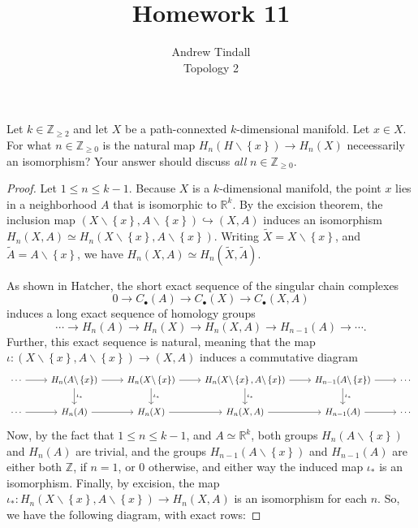 \documentclass[12pt]{article}
\newcommand{\Z}{\mathbb{Z}}
\newcommand{\R}{\mathbb{R}}
\theoremstyle{definition}
\newenvironment{problem}[2][Problem]{\begin{trivlist}
\item[\hskip \labelsep {\bfseries #1}\hskip \labelsep {\bfseries #2.}]}{\end{trivlist}}
\begin{document}
 
 
\title{Homework 11}
\author{Andrew Tindall \\
Topology 2}
\maketitle
\begin{problem}{1}
	Let $k \in \Z_{\geq 2}$ and let $X$ be a path-connexted $k$-dimensional manifold. Let $x \in X$. For what $n \in \Z_{\geq 0}$ is the natural map $H_n(H \backslash \left\{ x \right\}) \to H_n(X)$ neceessarily an isomorphism? Your answer should discuss \textit{all} $n \in \Z_{\geq 0}$.
	\begin{proof}
		\par Let $1 \leq n \leq k - 1$. Because $X$ is a $k$-dimensional manifold, the point $x$ lies in a neighborhood $A$ that is isomorphic to $\R^k$. By the excision theorem, the inclusion map $(X \backslash \left\{ x \right\}, A \backslash \left\{ x \right\}) \hookrightarrow (X, A)$ induces an isomorphism $H_n(X,A) \simeq H_n(X \backslash \left\{ x \right\}, A \backslash \left\{ x \right\})$. Writing $\tilde X = X \backslash \left\{ x \right\}$, and $\tilde A = A \backslash \left\{ x \right\}$, we have $H_n(X, A) \simeq H_n(\tilde X, \tilde A)$.
		\par As shown in Hatcher, the short exact sequence of the singular chain complexes \[0 \to C_\bullet(A) \to C_\bullet(X) \to C_\bullet(X, A)\]
		induces a long exact sequence of homology groups
		\[ \cdots \to H_n(A) \to H_n(X) \to H_n(X, A) \to H_{n-1}(A) \to \cdots.\]
		Further, this exact sequence is natural, meaning that the map $\iota: (X\backslash \left\{ x \right\}, A \backslash \left\{ x \right\}) \to (X, A)$ induces a commutative diagram
		\[\begin{tikzcd}\cdots \arrow[r] & H_n(A \backslash \left\{ x \right\}) \arrow[d, "\iota_*"] \arrow [r] & H_n(X \backslash \left\{ x \right\}) \arrow[d, "\iota_*"] \arrow[r] & H_n(X \backslash \left\{ x \right\}, A \backslash \left\{ x \right\}) \arrow[d, "\iota_*"] \arrow[r] & H_{n-1}(A \backslash \left\{ x \right\}) \arrow[d, "\iota_*"] \arrow[r] & \cdots\\
		\cdots \arrow[r] &H_n(A) \arrow[r] &H_n(X) \arrow[r] & H_n(X,A) \arrow[r] & H_{n-1}(A) \arrow[r] & \cdots \end{tikzcd}\]
		Now, by the fact that $1 \leq n \leq k-1$, and $A \simeq \R^k$, both groups $H_n(A \backslash \left\{ x \right\})$ and $H_n(A)$ are trivial, and the groups $H_{n-1}(A\backslash \left\{ x \right\} )$ and $H_{n-1}(A)$ are either both $\Z$, if $n = 1$, or $0$ otherwise, and either way the induced map $\iota_*$ is an isomorphism. Finally, by excision, the map $\iota_*: H_n(X \backslash \left\{ x \right\}, A \backslash \left\{ x \right\}) \to H_n(X, A)$ is an isomorphism for each $n$. So, we have the following diagram, with exact rows:

\end{proof}
\end{problem}
\end{document}
